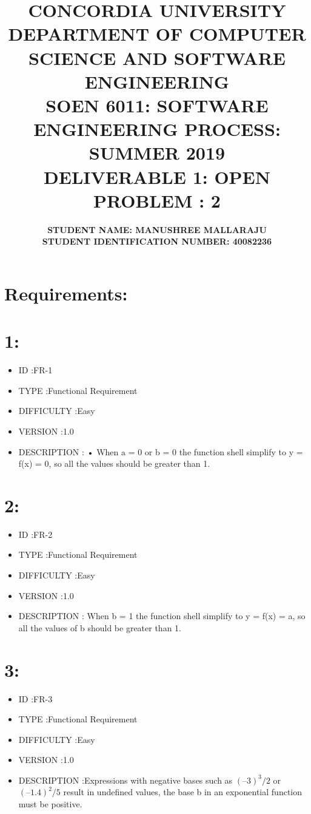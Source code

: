 \documentclass{report}
\title{{\large \textbf{CONCORDIA UNIVERSITY \\ DEPARTMENT OF COMPUTER SCIENCE AND SOFTWARE ENGINEERING \\ SOEN 6011: SOFTWARE ENGINEERING PROCESS: SUMMER 2019 \\ DELIVERABLE 1: OPEN PROBLEM : 2}}}
\author{\normalsize \textbf {STUDENT NAME: MANUSHREE MALLARAJU } \\ \normalsize \textbf{STUDENT IDENTIFICATION NUMBER: 40082236 }}
\begin{document}
\maketitle

\section*{Requirements:}
\section*{1:}
\begin{itemize}
  \item ID			:FR-1
  \item TYPE		:Functional Requirement
  \item DIFFICULTY	:Easy
  \item VERSION		:1.0
  \item DESCRIPTION	: •	When  a = 0  or  b = 0  the function shell simplify to  y = f(x) = 0, so all the values should be greater than 1.
\end{itemize}
\section*{2:}
\begin{itemize}
  \item ID			:FR-2
  \item TYPE		:Functional Requirement
  \item DIFFICULTY	:Easy
  \item VERSION		:1.0
  \item DESCRIPTION	: When  b = 1  the function shell simplify to  y = f(x) = a,  so all the values of b should be greater than 1.

\end{itemize}

\section*{3:}
\begin{itemize}
  \item ID			:FR-3
  \item TYPE		:Functional Requirement
  \item DIFFICULTY	:Easy
  \item VERSION		:1.0
  \item DESCRIPTION	:Expressions with negative bases such as $(–3)^3/2$  or  $(–1.4)^2/5$ result in undefined values, the base b in an exponential function must be positive. 
\end{itemize}
\end{document}
